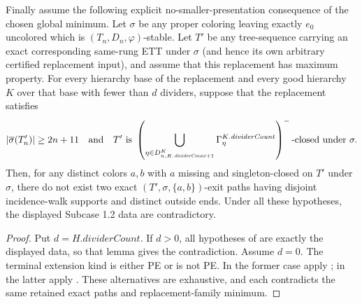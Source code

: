 \begin{lemma}
Finally assume the following explicit no-smaller-presentation consequence
of the chosen global minimum.  Let $\sigma$ be any proper coloring leaving
exactly $e_0$ uncolored which is $(T_n,D_n,\varphi)$-stable.  Let $T'$ be
any tree-sequence carrying an exact corresponding same-rung ETT under
$\sigma$ (and hence its own arbitrary certified replacement input), and
assume that this replacement has maximum property.  For every hierarchy
base of the replacement and every good hierarchy $K$ over that base with
fewer than $d$ dividers, suppose that the replacement satisfies
\[
 |\overline\sigma(T'_n)|\geq2n+11
 \quad\hbox{and}\quad
 T'\text{ is }
 \left(\bigcup_{\eta\in D^K_{n,K.\mathit{dividerCount}+1}}
   \Gamma^{K.\mathit{dividerCount}}_\eta\right)^-
 \text{-closed under }\sigma .
\]
Then, for any distinct colors $a,b$ with $a$ missing and singleton-closed
on $T'$ under $\sigma$, there do not exist two exact
$(T',\sigma,\{a,b\})$-exit paths having disjoint incidence-walk supports
and distinct outside ends.  Under all these hypotheses, the displayed
Subcase 1.2 data are contradictory.
\end{lemma}
\begin{proof}
Put $d=H.\mathit{dividerCount}$.  If $d>0$, all hypotheses of
 are exactly the displayed data,
so that lemma gives the contradiction.  Assume $d=0$.  The terminal
extension kind is either PE or is not PE.  In the former case apply
; in the latter apply
.  These alternatives are exhaustive,
and each contradicts the same retained exact paths and replacement-family
minimum.
\end{proof}
